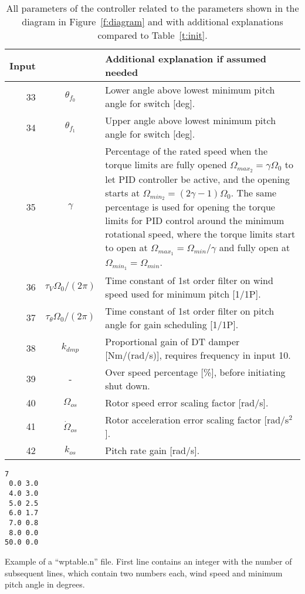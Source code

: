 \begin{table}[t!]
\begin{center}
\begin{tabular}{r|c|p{11.5cm}}
Input &  & Additional explanation if assumed needed \\ \hline
33 & $\theta_{f_0}$ & Lower angle above lowest minimum pitch angle for switch [deg]. \\
34 & $\theta_{f_1}$ & Upper angle above lowest minimum pitch angle for switch [deg]. \\
35 & $\gamma$ & Percentage of the rated speed when the torque limits are fully opened $\Omega_{max_2}=\gamma\Omega_0$ to let PID controller be active, and the opening starts at $\Omega_{min_2}=(2 \gamma -1)\Omega_0$. The same percentage is used for opening the torque limits for PID control around the minimum rotational speed, where the torque limits start to open at $\Omega_{max_1}=\Omega_{min}/\gamma$ and fully open at $\Omega_{min_1}=\Omega_{min}$. \\
36 & $\tau_V \Omega_0 /(2\pi)$ & Time constant of 1st order filter on wind speed used for minimum pitch [1/1P]. \\
37 & $\tau_{\theta} \Omega_0 /(2\pi)$ & Time constant of 1st order filter on pitch angle for gain scheduling [1/1P]. \\
38 & $k_{dmp}$ & Proportional gain of DT damper [Nm/(rad/s)], requires frequency in input 10. \\
\hline
39 & -& Over speed percentage  [\%], before initiating shut down. \\
\hline
40 & $\Omega_{os}$ & Rotor speed error scaling factor  [rad/s]. \\
41 & $\dot{\Omega}_{os}$ & Rotor acceleration error scaling factor  [rad/s${}^2$]. \\
42 & $k_{os}$ & Pitch rate gain  [rad/s].
\end{tabular}
\caption{All parameters of the controller related to the parameters shown in the diagram in Figure~\ref{f:diagram} and with additional explanations compared to Table~\ref{t:init}. \label{t:par}}
\end{center}
\end{table}

\begin{table}[t]
\begin{center}
\begin{verbatim}
7
 0.0 3.0
 4.0 3.0
 5.0 2.5
 6.0 1.7
 7.0 0.8
 8.0 0.0
50.0 0.0
\end{verbatim}
\caption{Example of a ``wptable.n'' file. First line contains an integer with the number of subsequent lines, which contain two numbers each, wind speed and minimum pitch angle in degrees.\label{t:wptable}}
\end{center}
\end{table}

